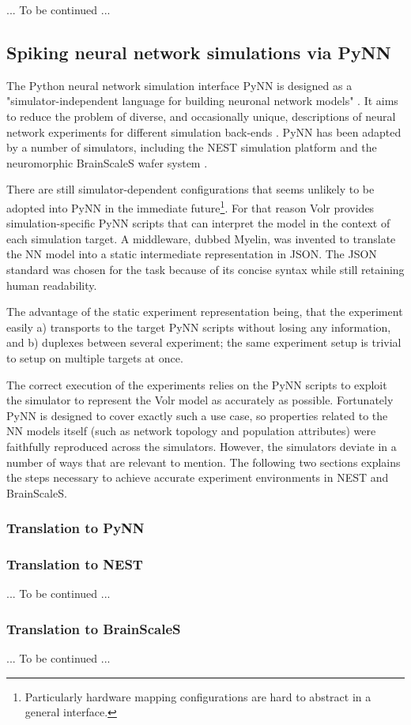 
... To be continued ...

\subsection{Spiking neural network simulations via PyNN} \label{sec:volr-pynn}
The Python neural network simulation interface PyNN is designed as a
"simulator-independent language for building neuronal network models"
\autocite{PyNN2018}.
It aims to reduce the problem of diverse, and occasionally unique, descriptions
of neural network experiments for different simulation back-ends \autocite{Davison2009}.
PyNN has been adapted by a number of simulators, including the NEST simulation
platform and the neuromorphic BrainScaleS wafer system
\autocite{Davison2009, Helias2012, Schmitt2017}.

There are still simulator-dependent configurations that seems unlikely to be
adopted into PyNN in the immediate future\footnote{
  Particularly hardware mapping configurations are hard to abstract in a general
  interface.
}.
For that reason Volr provides simulation-specific PyNN scripts that can
interpret the model in the context of each simulation target.
A middleware, dubbed \gls{Myelin}, was invented to translate the \gls{NN} model
into a static intermediate representation in JSON.
The JSON standard was chosen for the task because of its concise syntax while
still retaining human readability.

The advantage of the static experiment representation being, that the experiment
easily a) transports to the target PyNN scripts without losing any information,
and b) duplexes between several experiment; the same experiment setup is
trivial to setup on multiple targets at once.

The correct execution of the experiments relies on the PyNN scripts to exploit
the simulator to represent the Volr model as accurately as possible.
Fortunately PyNN is designed to cover exactly such a use case, so properties
related to the \gls{NN} models itself (such as network topology and population
attributes) were faithfully reproduced across the simulators.
However, the simulators deviate in a number of ways that are relevant to
mention.
The following two sections explains the steps necessary to achieve accurate
experiment environments in \gls{NEST} and \gls{BrainScaleS}.

\subsubsection{Translation to PyNN} \label{sec:volr-translation}

\subsubsection{Translation to NEST} \label{sec:volr-NEST}
... To be continued ...
\subsubsection{Translation to BrainScaleS} \label{sec:volr-BrainScaleS}
... To be continued ...
